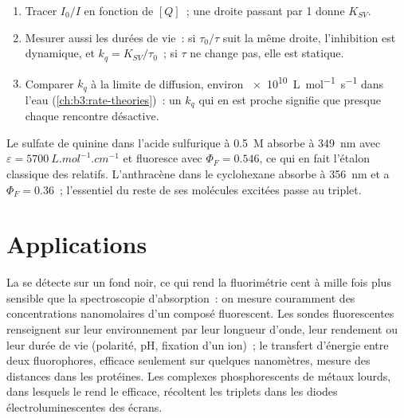 \begin{method}\label{met:b3:electronic-spectroscopy:stern-volmer}
\begin{enumerate}
  \item Tracer $I_0/I$ en fonction de $[Q]$~; une droite passant par 1
        donne $K_{SV}$.
  \item Mesurer aussi les durées de vie~: si $\tau_0/\tau$ suit la même
        droite, l'inhibition
        est dynamique, et $k_q = K_{SV}/\tau_0$~; si $\tau$ ne change pas,
        elle est statique.
  \item Comparer $k_q$ à la limite de diffusion, environ
        \qty{e10}{L.mol^{-1}.s^{-1}} dans
        l'eau (\cref{ch:b3:rate-theories})~: un $k_q$ qui en est proche
        signifie que presque chaque rencontre désactive.
\end{enumerate}
\end{method}

\begin{example}\label{ex:b3:electronic-spectroscopy:quinine}
Le sulfate de quinine dans l'acide sulfurique à \qty{0.5}{M} absorbe à
\qty{349}{nm} avec $\varepsilon =
\qty{5700}{L.mol^{-1}.cm^{-1}}$ et fluoresce avec $\Phi_F = 0.546$, ce qui
en fait l'étalon classique des  relatifs.
L'anthracène dans le cyclohexane
absorbe à \qty{356}{nm} et a $\Phi_F = 0.36$~; l'essentiel du reste de
ses molécules excitées passe au triplet.
\end{example}

\section{Applications}

La  se détecte sur un fond noir, ce qui rend la fluorimétrie
cent à mille fois plus sensible que la spectroscopie d'absorption~: on
mesure couramment des concentrations nanomolaires d'un composé
fluorescent. Les sondes fluorescentes renseignent sur leur environnement
par leur longueur d'onde, leur rendement ou leur durée de vie (polarité,
pH, fixation d'un ion)~; le transfert d'énergie entre deux fluorophores,
efficace seulement sur quelques nanomètres, mesure des distances dans
les protéines. Les complexes phosphorescents de métaux lourds, dans
lesquels le  rend le 
efficace, récoltent les triplets dans les diodes électroluminescentes
des écrans.

